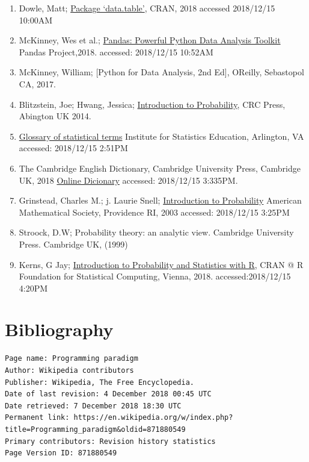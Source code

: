 \documentclass[]{book}
\theoremstyle{definition}
\theoremstyle{definition}
\theoremstyle{definition}
\theoremstyle{remark}
\begin{document}
\begin{enumerate}
\item
  Dowle, Matt; 
  \href{https://cran.r-project.org/web/packages/data.table/data.table.pdf}{Package
  `data.table'}, CRAN, 2018 accessed 2018/12/15 10:00AM
\item
  McKinney, Wes et al.; 
  \href{http://pandas.pydata.org/pandas-docs/stable/pandas.pdf}{Pandas:
  Powerful Python Data Analysis Toolkit} Pandas Project,2018. accessed:
  2018/12/15 10:52AM
\item
  McKinney, William; {[}Python for Data
  Analysis, 2nd Ed{]}, OReilly, Sebastopol CA, 2017.
\item
  Blitzstein, Joe; Hwang, Jessica;
  \href{https://www.amazon.com/Introduction-Probability-Chapman-Statistical-Science-ebook/dp/B00MMOJ19I}{Introduction
  to Probability}, CRC Press, Abington UK 2014.
\item
  \href{https://www.statistics.com/glossary}{Glossary of statistical
  terms} Institute for Statistics Education, Arlington, VA accessed:
  2018/12/15 2:51PM
\item
  The Cambridge English Dictionary, Cambridge University Press,
  Cambridge UK, 2018 \href{https://dictionary.cambridge.org/us/}{Online
  Dicionary} accessed: 2018/12/15 3:335PM.
\item
  Grinstead, Charles M.; j. Laurie Snell;
  \href{https://www.math.dartmouth.edu/~prob/prob/prob.pdf}{Introduction
  to Probability} American Mathematical Society, Providence RI, 2003
  accessed: 2018/12/15 3:25PM
\item
  Stroock, D.W; Probability theory: an analytic view. Cambridge
  University Press. Cambridge UK, (1999)
\item
  Kerns, G Jay;
  \href{https://cran.r-project.org/web/packages/IPSUR/vignettes/IPSUR.pdf}{Introduction
  to Probability and Statistics with R}, CRAN @ R Foundation for
  Statistical Computing, Vienna, 2018. accessed:2018/12/15 4:20PM
\end{enumerate}

\chapter{Bibliography}\label{bibliography}

\begin{verbatim}
Page name: Programming paradigm
Author: Wikipedia contributors
Publisher: Wikipedia, The Free Encyclopedia.
Date of last revision: 4 December 2018 00:45 UTC
Date retrieved: 7 December 2018 18:30 UTC
Permanent link: https://en.wikipedia.org/w/index.php?title=Programming_paradigm&oldid=871880549
Primary contributors: Revision history statistics
Page Version ID: 871880549
\end{verbatim}
\end{document}
